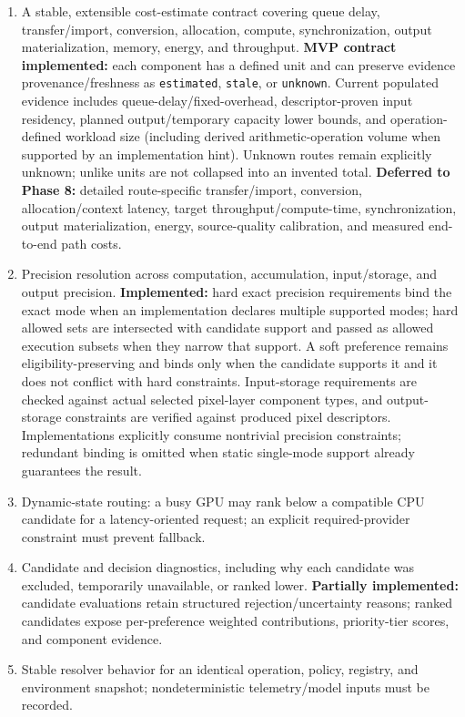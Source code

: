 \begin{enumerate}
  \item A stable, extensible cost-estimate contract covering queue delay, transfer/import, conversion, allocation, compute, synchronization, output materialization, memory, energy, and throughput. \textbf{MVP contract implemented:} each component has a defined unit and can preserve evidence provenance/freshness as \texttt{estimated}, \texttt{stale}, or \texttt{unknown}. Current populated evidence includes queue-delay/fixed-overhead, descriptor-proven input residency, planned output/temporary capacity lower bounds, and operation-defined workload size (including derived arithmetic-operation volume when supported by an implementation hint). Unknown routes remain explicitly unknown; unlike units are not collapsed into an invented total. \textbf{Deferred to Phase 8:} detailed route-specific transfer/import, conversion, allocation/context latency, target throughput/compute-time, synchronization, output materialization, energy, source-quality calibration, and measured end-to-end path costs.
  \item Precision resolution across computation, accumulation, input/storage, and output precision. \textbf{Implemented:} hard exact precision requirements bind the exact mode when an implementation declares multiple supported modes; hard allowed sets are intersected with candidate support and passed as allowed execution subsets when they narrow that support. A soft preference remains eligibility-preserving and binds only when the candidate supports it and it does not conflict with hard constraints. Input-storage requirements are checked against actual selected pixel-layer component types, and output-storage constraints are verified against produced pixel descriptors. Implementations explicitly consume nontrivial precision constraints; redundant binding is omitted when static single-mode support already guarantees the result.
  \item Dynamic-state routing: a busy GPU may rank below a compatible CPU candidate for a latency-oriented request; an explicit required-provider constraint must prevent fallback.
  \item Candidate and decision diagnostics, including why each candidate was excluded, temporarily unavailable, or ranked lower. \textbf{Partially implemented:} candidate evaluations retain structured rejection/uncertainty reasons; ranked candidates expose per-preference weighted contributions, priority-tier scores, and component evidence.
  \item Stable resolver behavior for an identical operation, policy, registry, and environment snapshot; nondeterministic telemetry/model inputs must be recorded.
\end{enumerate}

